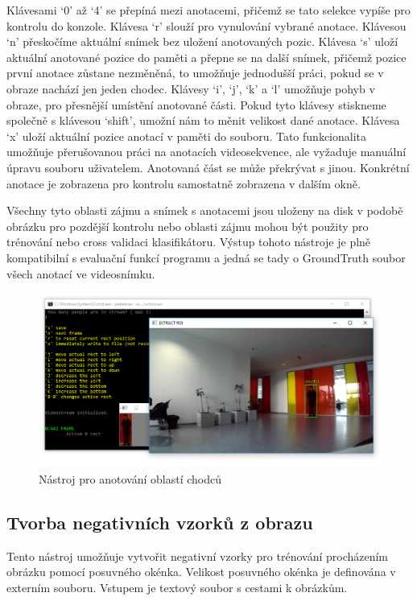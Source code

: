 Klávesami `0' až `4' se přepíná mezi anotacemi, přičemž se tato selekce vypíše pro kontrolu do konzole. Klávesa `r' slouží pro vynulování vybrané anotace. Klávesou `n' přeskočíme aktuální snímek bez uložení anotovaných pozic. Klávesa `s' uloží aktuální anotované pozice do paměti a přepne se na další snímek, přičemž pozice první anotace zůstane nezměněná, to umožňuje jednodušší práci, pokud se v obraze nachází jen jeden chodec. Klávesy `i', `j', `k' a `l' umožňuje pohyb v obraze, pro přesnější umístění anotované části. Pokud tyto klávesy stiskneme společně s klávesou `shift', umožní nám to měnit velikost dané anotace. Klávesa `x' uloží aktuální pozice anotací v paměti do souboru. Tato funkcionalita umožňuje přerušovanou práci na anotacích videosekvence, ale vyžaduje manuální úpravu souboru uživatelem. Anotovaná část se může překrývat s jinou. Konkrétní anotace je zobrazena pro kontrolu samostatně zobrazena v dalším okně.

Všechny tyto oblasti zájmu a snímek s anotacemi jsou uloženy na disk v podobě obrázku pro pozdější kontrolu nebo oblasti zájmu mohou být použity pro trénování nebo cross validaci klasifikátoru. Výstup tohoto nástroje je plně kompatibilní s evaluační funkcí programu a jedná se tady o GroundTruth soubor všech anotací ve videosnímku.
 \begin{figure}[H]
\centering
\includegraphics[width=15cm]{figures/annotation_example}
\caption{Nástroj pro anotování oblastí chodců}
\label{tool_anotate}
\end{figure}

\subsection{Tvorba negativních vzorků z obrazu}
Tento nástroj umožňuje vytvořit negativní vzorky pro trénování procházením obrázku pomocí posuvného okénka. Velikost posuvného okénka je definována v externím souboru. Vstupem je textový soubor s cestami k obrázkům.
